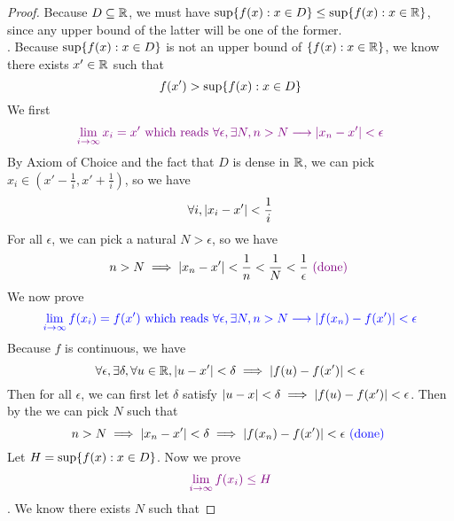 \documentclass{report}
\begin{document}
\begin{proof}
Because $D\subseteq \mathbb{R}$, we must have $\sup \{ f(x): x\in D \}\leq \sup \{ f(x): x\in \mathbb{R} \}$, since any upper bound of the latter will be one of the former.\\

. Because $\sup \{ f(x):x\in D \}$ is not an upper bound of $\{ f(x):x\in \mathbb{R} \}$, we know there exists $x'\in \mathbb{R}$ such that 
\begin{equation}
f(x')>\sup \{ f(x):x\in D \}
\end{equation}
We first  
\begin{equation}
  \textcolor{violet}{\lim_{i\to \infty}x_i=x'\text{ which reads } \forall \epsilon, \exists N, n>N \longrightarrow |x_n - x'|<\epsilon}
\end{equation}
By Axiom of Choice and the fact that $D$ is dense in  $\mathbb{R}$, we can pick $x_i \in (x'- \frac{1}{i},x' +\frac{1}{i})$, so we have
\begin{equation}
\forall i, |x_i-x'|<\frac{1}{i}
\end{equation}
For all $\epsilon $, we can pick a natural $N>\epsilon $, so we have 
\begin{equation}
n>N\implies |x_n-x'|<\frac{1}{n}<\frac{1}{N}<\frac{1}{\epsilon }\textcolor{violet}{\text{ (done) }}
\end{equation}
We now prove 
\begin{equation}
\textcolor{blue}{\lim_{i\to\infty}f(x_i)=f(x')\text{ which reads }\forall \epsilon , \exists N, n>N\longrightarrow  |f(x_n)-f(x')|<\epsilon }
\end{equation}
Because $f$ is continuous, we have 
\begin{equation}
  \forall \epsilon ,\exists \delta, \forall u\in \mathbb{R}, |u-x'|<\delta\implies |f(u)-f(x')|<\epsilon  
\end{equation}
Then for all $\epsilon $, we can first let $\delta$ satisfy $|u-x|<\delta \implies |f(u)-f(x')|<\epsilon $. Then by the  we can pick $N$ such that 
\begin{equation}
n>N\implies |x_n - x'|< \delta \implies |f(x_n)-f(x')|<\epsilon \textcolor{blue}{\text{ (done) }} 
\end{equation}
Let $H=\sup \{ f(x): x\in D \}$. Now we prove  
\begin{equation}
  \textcolor{violet}{\lim_{i \to \infty}f(x_i)\leq H}
\end{equation}
. We know there exists $N$ such that 

\end{proof}
\end{document}
